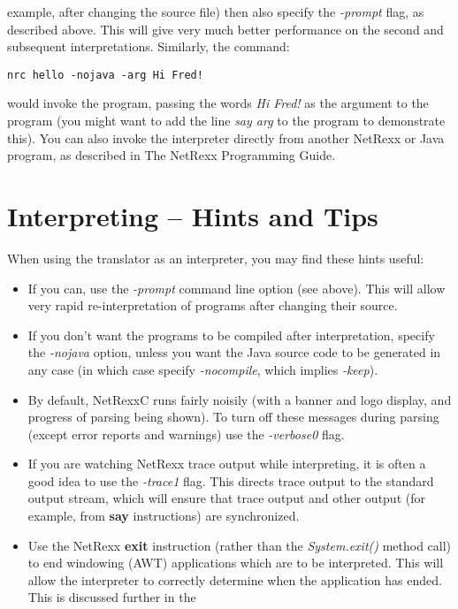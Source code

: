 example, after changing the source file) then also specify
the \emph{-prompt} flag, as described above.  This will give very much
better performance on the second and subsequent interpretations.
\newline
Similarly, the command:
\begin{verbatim}
nrc hello -nojava -arg Hi Fred!
\end{verbatim}
would invoke the program, passing the words \emph{Hi Fred!} as
the argument to the program (you might want to add the line \emph{say
arg} to the program to demonstrate this).
\newline
You can also invoke the interpreter directly from another NetRexx or
Java program, as described in The NetRexx Programming Guide.

\section{Interpreting -- Hints and Tips}

When using the translator as an interpreter, you may find these hints
useful:
\begin{itemize}
\item If you can, use the \emph{-prompt} command line option (see above).
This will allow very rapid re-interpretation of programs after changing
their source.
\item If you don't want the programs to be compiled after interpretation,
specify the \emph{-nojava} option, unless you want the Java source code
to be generated in any case (in which case specify \emph{-nocompile},
which implies \emph{-keep}).
\item By default, NetRexxC runs fairly noisily (with a banner and logo
display, and progress of parsing being shown).  To turn off these
messages during parsing (except error reports and warnings) use
the \emph{-verbose0} flag.
\item
{}
If you are watching NetRexx trace output while interpreting, it is often
a good idea to use the \emph{-trace1} flag.  This directs trace output
to the standard output stream, which will ensure that trace output and
other output (for example, from \textbf{say} instructions) are
synchronized.
\item
Use the NetRexx \textbf{exit} instruction (rather than the \emph{System.exit()}
method call) to end windowing (AWT) applications which are to be
interpreted.  This will allow the interpreter to correctly determine
when the application has ended.  This is discussed further in the
\end{itemize}


